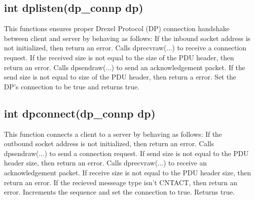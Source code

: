 \documentclass[12pt, a4paper]{article}
\begin{document}
{\subsection{int dplisten(dp\_connp dp)}
This functions ensures proper Drexel Protocol (DP) connection handshake between client and server by behaving as follows: \newline
\indent If the inbound socket address is not initialized, then return an error. \newline
\indent Calls dprecvraw(...) to receive a connection request. If the received size \newline
\indent\indent is not equal to the size of the PDU header, then return an error. \newline
\indent Calls dpsendraw(...) to send an acknowledgement packet. If the send size \newline
\indent\indent is not equal to size of the PDU header, then return a error. \newline
\indent Set the DP's connection to be true and returns true.

\subsection{int dpconnect(dp\_connp dp)}
This function connects a client to a server by behaving as follows: \newline
\indent If the outbound socket address is not initialized, then return an error. \newline
\indent Calls dpsendraw(...) to send a connection request. If send size is not \newline
\indent\indent equal to the PDU header size, then return an error. \newline
\indent Calls dprecvraw(...) to receive an acknowledgement packet. If receive \newline
\indent\indent size is not equal to the PDU header size, then return an error. \newline
\indent\indent If the recieved messeage type isn't CNTACT, then return an error. \newline
\indent Increments the sequence and set the connection to true. \newline
\indent Returns true.

}
\end{document}
